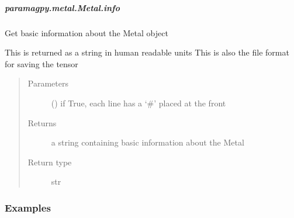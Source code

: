 \documentclass[a4paper,10pt,english,openany,oneside]{sphinxmanual}
\begin{document}
\begin{fulllineitems}
\begin{fulllineitems}
\begin{fulllineitems}
\end{fulllineitems}



\subparagraph{paramagpy.metal.Metal.info}
\label{\detokenize{reference/generated/paramagpy.metal.Metal.info:paramagpy-metal-metal-info}}\label{\detokenize{reference/generated/paramagpy.metal.Metal.info::doc}}

\begin{fulllineitems}
\label{\detokenize{reference/generated/paramagpy.metal.Metal.info:paramagpy.metal.Metal.info}}
\sphinxAtStartPar
Get basic information about the Metal object

\sphinxAtStartPar
This is returned as a string in human readable units
This is also the file format for saving the tensor
\begin{quote}\begin{description}
\item[{Parameters}] \leavevmode
\sphinxAtStartPar
{} (\sphinxstyleliteralemphasis{\sphinxupquote{ (}}\sphinxstyleliteralemphasis{\sphinxupquote{)}}) \textendash{} if True, each line has a ‘\#’ placed at the front

\item[{Returns}] \leavevmode
\sphinxAtStartPar
{} \textendash{} a string containing basic information about the Metal

\item[{Return type}] \leavevmode
\sphinxAtStartPar
str

\end{description}\end{quote}
\subsubsection*{Examples}


\end{fulllineitems}
\end{fulllineitems}
\end{fulllineitems}
\end{document}
